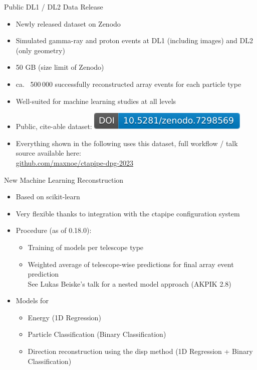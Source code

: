 \documentclass[aspectratio=1610, 9pt]{beamer}
\begin{document}
\begin{frame}{Public DL1 / DL2 Data Release}
  \begin{itemize}
    \item Newly released dataset on Zenodo
    \item Simulated gamma-ray and proton events at DL1 (including images) and DL2 (only geometry) 
    \item 50 GB (size limit of Zenodo)
    \item ca.~ 500\,000 successfully reconstructed array events for each particle type
    \item Well-suited for machine learning studies at all levels
    \item Public, cite-able dataset: \href{https://doi.org/10.5281/zenodo.7298568}{\includegraphics[height=2ex]{./images/public_data_zenodo.pdf}}

    \item Everything shown in the following uses this dataset, full workflow / talk source available here: \\
      \href{https://github.com/maxnoe/ctapipe-dpg-2023}{github.com/maxnoe/ctapipe-dpg-2023}
  \end{itemize}
\end{frame}

\begin{frame}{New Machine Learning Reconstruction}
  \begin{itemize}
    \item Based on scikit-learn
    \item Very flexible thanks to integration with the ctapipe configuration system
    \item Procedure (as of 0.18.0):
      \begin{itemize}
        \item Training of models per telescope type
        \item Weighted average of telescope-wise predictions for final array event prediction\\
          See Lukas Beiske's talk for a nested model approach (AKPIK 2.8) 
      \end{itemize}
    \item Models for
      \begin{itemize}
        \item Energy (1D Regression)
        \item Particle Classification (Binary Classification)
        \item Direction reconstruction using the disp method (1D Regression + Binary Classification)
      \end{itemize}
  \end{itemize}
\end{frame}
\end{document}
